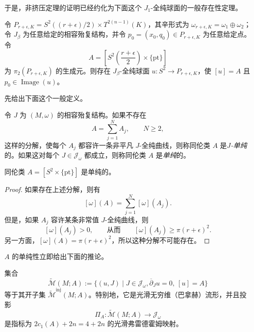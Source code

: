 于是，非挤压定理的证明已经约化为下面这个 $J_1$-全纯球面的一般存在性定理。

\begin{theorem}\label{thm:ch11-sphere-through-point}
令
$P_{r+\epsilon,K}=S^2((r+\epsilon)/2)\times T^{2(n-1)}(K)$，其辛形式为
$\omega_{r+\epsilon,K}=\omega_1\oplus\omega_2$；令 $J_\beta$ 为任意给定的相容殆复结构，并令 $p_0=(x_0,q_0)\in P_{r+\epsilon,K}$ 为任意给定点。令
\[
 A=\left[S^2\left(\frac{r+\epsilon}{2}\right)\times\{\mathrm{pt}\}\right]
\]
为 $\pi_2(P_{r+\epsilon,K})$ 的生成元。则存在 $J_\beta$-全纯球面
$u:S^2\to P_{r+\epsilon,K}$，使 $[u]=A$ 且 $p_0\in\operatorname{Image}(u)$。
\end{theorem}

先给出下面这个一般定义。

\begin{definition}\label{def:ch11-j-simple-class}
令 $J$ 为 $(M,\omega)$ 的相容殆复结构。如果不存在
\[
 A=\sum_{j=1}^N A_j,\qquad N\geq2,
\]
这样的分解，使每个 $A_j$ 都容许一条非平凡 $J$-全纯曲线，则称同伦类 $A$ 是\emph{$J$-单纯}的。如果这对每个 $J\in\mathcal J_\omega$ 都成立，则称同伦类 $A$ 是\emph{单纯}的。
\end{definition}

\begin{lemma}\label{lem:ch11-fiber-sphere-class-simple}
同伦类 $A=[S^2\times\{\mathrm{pt}\}]$ 是单纯的。
\end{lemma}

\begin{proof}
如果存在上述分解，则有
\[
 [\omega](A)=\sum_{j=1}^N[\omega](A_j).
\]
但是，如果 $A_j$ 容许某条非常值 $J$-全纯曲线，则
\[
 [\omega](A_j)>0,
 \qquad\text{从而}\qquad
 [\omega](A_j)\geq\pi(r+\epsilon)^2.
\]
另一方面，$[\omega](A)=\pi(r+\epsilon)^2$，所以这种分解不可能存在。
\end{proof}

$A$ 的单纯性立即给出下面的推论。

\begin{corollary}\label{cor:ch11-universal-moduli-injective}
集合
\[
 \widetilde{\mathcal M}(M;A)
 :=\{(u,J)\mid J\in\mathcal J_\omega,
 \overline\partial_Ju=0,\ [u]=A\}
\]
等于其开子集 $\widetilde{\mathcal M}^{\mathrm{inj}}(M;A)$。特别地，它是光滑无穷维（巴拿赫）流形，并且投影
\[
 \Pi_A:\widetilde{\mathcal M}(M;A)\longrightarrow\mathcal J_\omega
\]
是指标为 $2c_1(A)+2n=4+2n$ 的光滑弗雷德霍姆映射。
\end{corollary}

